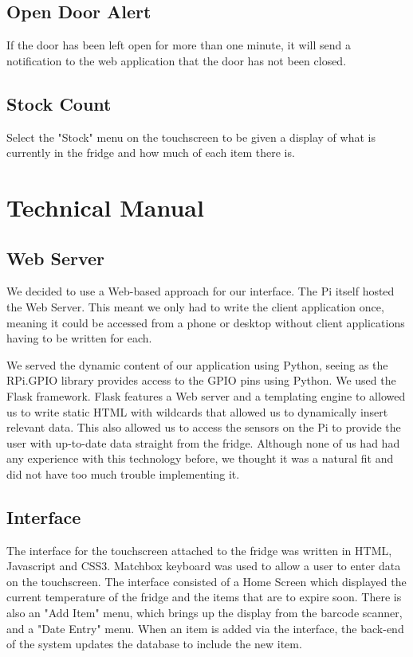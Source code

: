 \documentclass[10pt]{article}
\begin{document}
\subsection{Open Door Alert}
If the door has been left open for more than one minute, it will send a notification to the web application that the door has not been closed.

\subsection{Stock Count}
Select the "Stock" menu on the touchscreen to be given a display of what is currently in the fridge and how much of each item there is.




\section{Technical Manual}

\subsection{Web Server}
We decided to use a Web-based approach for our interface. The Pi itself hosted the Web Server. This meant we only had to write the client application once, meaning it could be accessed from a phone or desktop without client applications having to be written for each.

We served the dynamic content of our application using Python, seeing as the RPi.GPIO library provides access to the GPIO pins using Python. We used the Flask framework. Flask features a Web server and a templating engine to allowed us to write static HTML with wildcards that allowed us to dynamically insert relevant data. This also allowed us to access the sensors on the Pi to provide the user with up-to-date data straight from the fridge. Although none of us had had any experience with this technology before, we thought it was a natural fit and did not have too much trouble implementing it.

\subsection{Interface}
The interface for the touchscreen attached to the fridge was written in HTML, Javascript and CSS3. Matchbox keyboard was used to allow a user to enter data on the touchscreen. The interface consisted of a Home Screen which displayed the current temperature of the fridge and the items that are to expire soon. There is also an "Add Item" menu, which brings up the display from the barcode scanner, and a "Date Entry" menu. When an item is added via the interface, the back-end of the system updates the database to include the new item.
\end{document}
